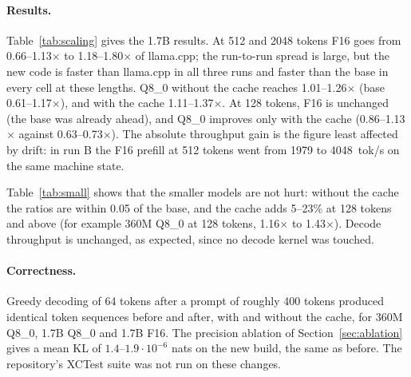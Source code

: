 \documentclass[10pt,twocolumn]{article}
\begin{document}
\paragraph{Results.}
\begin{table}[t]\centering\small

\caption{SmolLM2-1.7B prefill: alpaca/llama.cpp throughput ratio before (base) and after (new; cache = new with \texttt{--prefill-cache}), measured back-to-back with llama.cpp on the same file. Ratios above 1 favour alpaca. Run A used an earlier variant that applied the $128$-token tile to every matrix; runs B and C used the final adaptive rule. Run C was taken while the machine was degraded (llama.cpp's absolute speed was about half that of run B), which compresses the ratios.}
\label{tab:scaling}
\end{table}
\begin{table}[t]\centering\small

\caption{135M and 360M prefill at $n{=}512$, alpaca/llama.cpp ratio before and after (single run).}
\label{tab:small}
\end{table}
Table~\ref{tab:scaling} gives the 1.7B results. At 512 and 2048 tokens F16 goes from 0.66--1.13$\times$ to 1.18--1.80$\times$ of llama.cpp; the run-to-run spread is large, but the new code is faster than llama.cpp in all three runs and faster than the base in every cell at these lengths. Q8\_0 without the cache reaches 1.01--1.26$\times$ (base 0.61--1.17$\times$), and with the cache 1.11--1.37$\times$. At 128 tokens, F16 is unchanged (the base was already ahead), and Q8\_0 improves only with the cache (0.86--1.13$\times$ against 0.63--0.73$\times$). The absolute throughput gain is the figure least affected by drift: in run B the F16 prefill at 512 tokens went from 1979 to 4048~tok/s on the same machine state.

Table~\ref{tab:small} shows that the smaller models are not hurt: without the cache the ratios are within 0.05 of the base, and the cache adds 5--23\% at 128 tokens and above (for example 360M Q8\_0 at 128 tokens, 1.16$\times$ to 1.43$\times$). Decode throughput is unchanged, as expected, since no decode kernel was touched.

\paragraph{Correctness.} Greedy decoding of 64 tokens after a prompt of roughly 400 tokens produced identical token sequences before and after, with and without the cache, for 360M Q8\_0, 1.7B Q8\_0 and 1.7B F16. The precision ablation of Section~\ref{sec:ablation} gives a mean KL of $1.4$--$1.9\cdot10^{-6}$ nats on the new build, the same as before. The repository's XCTest suite was not run on these changes.
\end{document}
